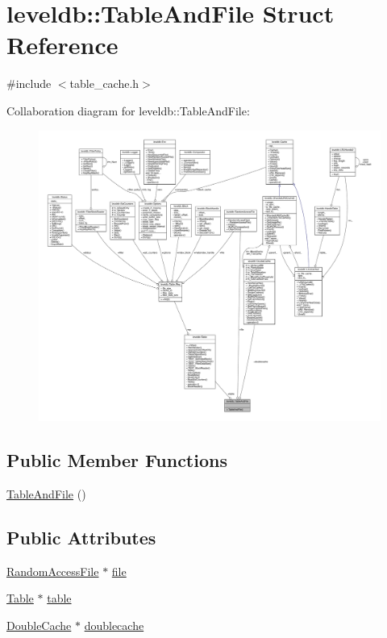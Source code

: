 \hypertarget{structleveldb_1_1_table_and_file}{}\section{leveldb\+:\+:Table\+And\+File Struct Reference}
\label{structleveldb_1_1_table_and_file}


{\ttfamily \#include $<$table\+\_\+cache.\+h$>$}



Collaboration diagram for leveldb\+:\+:Table\+And\+File\+:
\nopagebreak
\begin{figure}[H]
\begin{center}
\leavevmode
\includegraphics[width=350pt]{structleveldb_1_1_table_and_file__coll__graph}
\end{center}
\end{figure}
\subsection*{Public Member Functions}
\begin{DoxyCompactItemize}
\item 
\hyperlink{structleveldb_1_1_table_and_file_abab42cdb915ce5eb97f0bb6b72ca8dc1}{Table\+And\+File} ()
\end{DoxyCompactItemize}
\subsection*{Public Attributes}
\begin{DoxyCompactItemize}
\item 
\hyperlink{classleveldb_1_1_random_access_file}{Random\+Access\+File} $\ast$ \hyperlink{structleveldb_1_1_table_and_file_a7f1f72d4654e4ab49aab750330036edb}{file}
\item 
\hyperlink{classleveldb_1_1_table}{Table} $\ast$ \hyperlink{structleveldb_1_1_table_and_file_ab2df8b8a6c028cfcf36885fe76f48c99}{table}
\item 
\hyperlink{classleveldb_1_1_double_cache}{Double\+Cache} $\ast$ \hyperlink{structleveldb_1_1_table_and_file_a07e18b06731cbdce0714b2f66136c0c2}{doublecache}
\end{DoxyCompactItemize}


